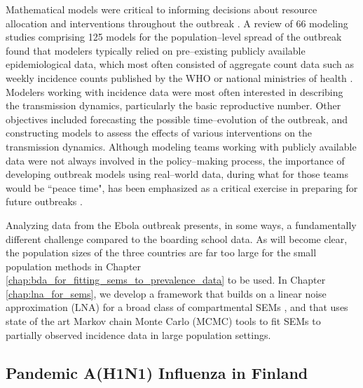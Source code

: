 Mathematical models were critical to informing decisions about resource allocation and interventions throughout the outbreak \cite{coltart2017ebola}. A review of 66 modeling studies comprising 125 models for the population--level spread of the outbreak found that modelers typically relied on pre--existing publicly available epidemiological data, which most often consisted of aggregate count data such as weekly incidence counts published by the WHO or national ministries of health \cite{chretien2015mathematical}. Modelers working with incidence data were most often interested in describing the transmission dynamics, particularly the basic reproductive number. Other objectives included forecasting the possible time--evolution of the outbreak, and constructing models to assess the effects of various interventions on the transmission dynamics. Although modeling teams working with publicly available data were not always involved in the policy--making process, the importance of developing outbreak models using real--world data, during what for those teams would be ``peace time", has been emphasized as a critical exercise in preparing for future outbreaks \cite{viboud2018rapidd}.

Analyzing data from the Ebola outbreak presents, in some ways, a fundamentally different challenge compared to the boarding school data. As will become clear, the population sizes of the three countries are far too large for the small population methods in Chapter \ref{chap:bda_for_fitting_sems_to_prevalence_data} to be used. In Chapter \ref{chap:lna_for_sems}, we develop a framework that builds on a linear noise approximation (LNA) for a broad class of compartmental SEMs \cite{fearnhead2014,komorowski2009,ross2009parameter,wilkinson2011stochastic}, and that uses state of the art Markov chain Monte Carlo (MCMC) tools to fit SEMs to partially observed incidence data in large population settings. 

\subsection{Pandemic A(H1N1) Influenza in Finland}
\label{subsec:flu_description}


